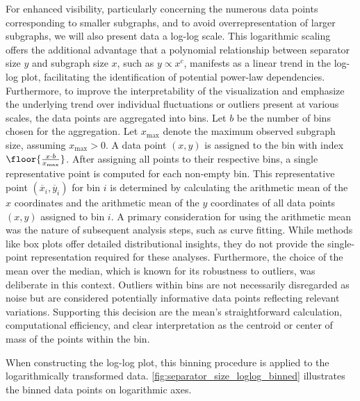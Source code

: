 For enhanced visibility, particularly concerning the numerous data points corresponding to smaller subgraphs, and to avoid overrepresentation of larger subgraphs, we will also present data a log-log scale.
This logarithmic scaling offers the additional advantage that a polynomial relationship between separator size \( y \) and subgraph size \( x \), such as \( y \propto x^c \), manifests as a linear trend in the log-log plot, facilitating the identification of potential power-law dependencies.
Furthermore, to improve the interpretability of the visualization and emphasize the underlying trend over individual fluctuations or outliers present at various scales, the data points are aggregated into bins.
Let \( b \) be the number of bins chosen for the aggregation.
Let \( x_{\max} \) denote the maximum observed subgraph size, assuming \( x_{\max} > 0 \).
A data point \( (x, y) \) is assigned to the bin with index \( \floor{\frac{x \cdot b}{x_{\max}}} \).
After assigning all points to their respective bins, a single representative point is computed for each non-empty bin.
This representative point \( (\overline{x}_i, \overline{y}_i) \) for bin \( i \) is determined by calculating the arithmetic mean of the \( x \) coordinates and the arithmetic mean of the \( y \) coordinates of all data points \( (x, y) \) assigned to bin \( i \).
A primary consideration for using the arithmetic mean was the nature of subsequent analysis steps, such as curve fitting.
While methods like box plots offer detailed distributional insights, they do not provide the single-point representation required for these analyses.
Furthermore, the choice of the mean over the median, which is known for its robustness to outliers, was deliberate in this context.
Outliers within bins are not necessarily disregarded as noise but are considered potentially informative data points reflecting relevant variations.
Supporting this decision are the mean's straightforward calculation, computational efficiency, and clear interpretation as the centroid or center of mass of the points within the bin.

When constructing the log-log plot, this binning procedure is applied to the logarithmically transformed data.
\cref{fig:separator_size_loglog_binned} illustrates the binned data points on logarithmic axes.

